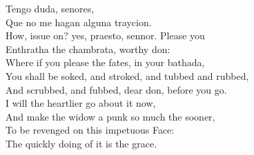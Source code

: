 \documentclass[a4paper,oneside,12pt]{memoir}
\begin{document}
\begin{drama*}
\surlyspeaks {} Tengo duda, senores,\\
Que no me hagan alguna traycion.\\
\subtlespeaks How, issue on? yes, praesto, sennor. Please you\\
Enthratha the chambrata, worthy don:\\
Where if you please the fates, in your bathada,\\
You shall be soked, and stroked, and tubbed and rubbed,\\
And scrubbed, and fubbed, dear don, before you go.\\
I will the heartlier go about it now,\\
And make the widow a punk so much the sooner,\\
To be revenged on this impetuous Face:\\
The quickly doing of it is the grace.\\
\scene


\end{drama*}
\end{document}
